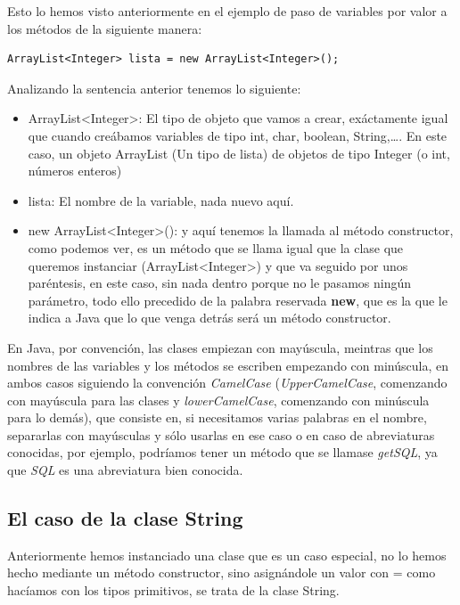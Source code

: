 \documentclass[11pt]{article}
\begin{document}
Esto lo hemos visto anteriormente en el ejemplo de paso de variables por valor a los métodos de la siguiente manera:

\begin{verbatim}
ArrayList<Integer> lista = new ArrayList<Integer>();
\end{verbatim}

Analizando la sentencia anterior tenemos lo siguiente:
\begin{itemize}
\item ArrayList<Integer>: El tipo de objeto que vamos a crear, exáctamente igual que cuando creábamos variables de tipo int, char, boolean, String,\ldots{}. En este caso, un objeto ArrayList (Un tipo de lista) de objetos de tipo Integer (o int, números enteros)
\item lista: El nombre de la variable, nada nuevo aquí.
\item new ArrayList<Integer>(): y aquí tenemos la llamada al método constructor, como podemos ver, es un método que se llama igual que la clase que queremos instanciar (ArrayList<Integer>) y que va seguido por unos paréntesis, en este caso, sin nada dentro porque no le pasamos ningún parámetro, todo ello precedido de la palabra reservada \textbf{new}, que es la que le indica a Java que lo que venga detrás será un método constructor.
\end{itemize}

En Java, por convención, las clases empiezan con mayúscula, meintras que los nombres de las variables y los métodos se escriben empezando con minúscula, en ambos casos siguiendo la convención \emph{CamelCase} (\emph{UpperCamelCase}, comenzando con mayúscula para las clases y \emph{lowerCamelCase}, comenzando con minúscula para lo demás), que consiste en, si necesitamos varias palabras en el nombre, separarlas con mayúsculas y sólo usarlas en ese caso o en caso de abreviaturas conocidas, por ejemplo, podríamos tener un método que se llamase \emph{getSQL}, ya que \emph{SQL} es una abreviatura bien conocida.

\subsection{El caso de la clase String}
\label{sec:orgc0e88a0}

Anteriormente hemos instanciado una clase que es un caso especial, no lo hemos hecho mediante un método constructor, sino asignándole un valor con = como hacíamos con los tipos primitivos, se trata de la clase String.
\end{document}
